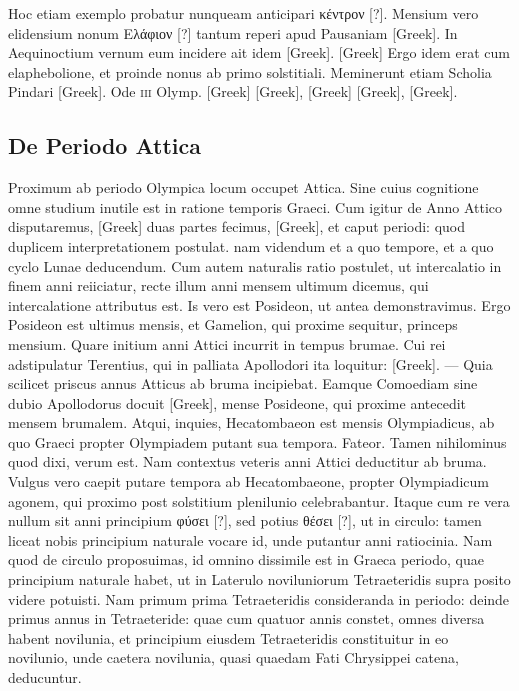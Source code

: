 Hoc etiam exemplo probatur nunqueam anticipari
\textgreek{κέντρον [?]}.
Mensium vero elidensium nonum \textgreek{Ελάφιον [?]} tantum reperi apud
Pausaniam \textgreek{[Greek]}.
In Aequinoctium
vernum eum incidere ait idem \textgreek{[Greek]}.
\textgreek{[Greek]}
Ergo idem erat cum elaphebolione, et
proinde nonus ab primo solstitiali.
Meminerunt etiam Scholia Pindari
\textgreek{[Greek]}.
Ode \textsc{iii} Olymp.
\textgreek{[Greek]}
\textgreek{[Greek]}, \textgreek{[Greek]}
\textgreek{[Greek]}, \textgreek{[Greek]}.

\subsection{De Periodo Attica}

Proximum ab periodo Olympica locum occupet Attica.
Sine
cuius cognitione omne studium inutile est in ratione temporis
Graeci.
Cum igitur de Anno Attico disputaremus, \textgreek{[Greek]} duas
partes fecimus, \textgreek{[Greek]}, et caput periodi: quod duplicem
interpretationem postulat.
nam videndum et a quo tempore, et a quo
cyclo Lunae deducendum.
Cum autem naturalis ratio postulet, ut intercalatio
in finem anni reiiciatur, recte illum anni mensem ultimum
dicemus, qui intercalatione attributus est.
Is vero est Posideon, ut antea
demonstravimus.
Ergo Posideon est ultimus mensis, et Gamelion,
qui proxime sequitur, princeps mensium.
Quare initium
anni Attici incurrit in tempus brumae.
Cui rei adstipulatur Terentius,
qui in palliata Apollodori ita loquitur: \textgreek{[Greek]}.
--- Quia scilicet priscus annus Atticus
ab bruma incipiebat.
Eamque Comoediam sine dubio Apollodorus
docuit \textgreek{[Greek]}, mense Posideone, qui proxime antecedit
mensem brumalem.
Atqui, inquies, Hecatombaeon est mensis
Olympiadicus, ab quo Graeci propter Olympiadem putant sua
tempora.
Fateor.
Tamen nihilominus quod dixi, verum est.
Nam
contextus veteris anni Attici deductitur ab bruma.
Vulgus vero caepit
putare tempora ab Hecatombaeone, propter Olympiadicum agonem,
qui proximo post solstitium plenilunio celebrabantur.
Itaque cum re
vera nullum sit anni principium \textgreek{φύσει [?]},
 sed potius \textgreek{θέσει [?]}, ut in circulo:
tamen liceat nobis principium naturale vocare id, unde putantur anni
ratiocinia.
Nam quod de circulo proposuimas, id omnino dissimile
est in Graeca periodo, quae principium naturale habet, ut in Laterulo
noviluniorum Tetraeteridis supra posito videre potuisti.
Nam primum
prima Tetraeteridis consideranda in periodo: deinde primus annus
in Tetraeteride: quae cum quatuor annis constet, omnes diversa
habent novilunia, et principium eiusdem Tetraeteridis constituitur
in eo novilunio, unde caetera novilunia, quasi quaedam Fati Chrysippei
catena, deducuntur.

